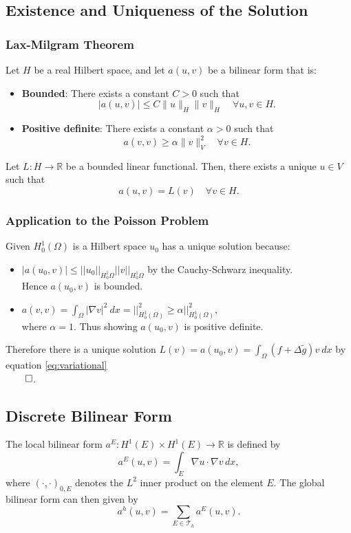 \documentclass[class=article, crop=false]{standalone}
\begin{document}
\subsection{Existence and Uniqueness of the Solution}

\subsubsection{Lax-Milgram Theorem}
\begin{theorem}
    Let $H$ be a real Hilbert space, and let $a(u,v)$  be a bilinear form that is:
    \begin{itemize}
        \item \textbf{Bounded}: There exists a constant $C > 0$ such that
        $$
        |a(u, v)| \leq C \|u\|_H \|v\|_H \quad \forall u, v \in H.
        $$
        \item \textbf{Positive definite}: There exists a constant $\alpha > 0$ such that
        $$
        a(v, v) \geq \alpha \|v\|_V^2 \quad \forall v \in H.
        $$
    \end{itemize}
    Let $L: H \rightarrow \mathbb{R}$ be a bounded linear functional. Then, there exists a unique $u \in V$ such that
    $$
    a(u, v) = L(v) \quad \forall v \in H.
    $$
\end{theorem}

\subsubsection{Application to the Poisson Problem}
Given $H^1_0(\Omega)$ is a Hilbert space $u_0$ has a unique solution because:
\begin{itemize}
    \item $|a(u_0,v)| \leq ||u_0||_{H^1_0{\Omega}} ||v||_{H^1_0{\Omega}} $ by the Cauchy-Schwarz inequality.\\
    Hence $a(u_0,v)$ is bounded.

    \item $a(v,v) = \int_{\Omega}|\nabla v|^2\ dx = ||^2_{H_0^1(\Omega)} \geq \alpha||^2_{H_0^1(\Omega)}$,\\
    where $\alpha = 1.$ Thus showing $a(u_0,v)$ is positive definite.
\end{itemize}

Therefore there is a unique solution $L(v) = a(u_0,v) = \int_\Omega (f + \Delta\tilde{g})v\ dx$ by equation \eqref{eq:variational}\\
$\qed$.

\subsection{Discrete Bilinear Form}
The local bilinear form $a^E: H^1(E) \times H^1(E) \rightarrow \mathbb{R}$ is defined by
$$
a^E(u, v) = \int_E \nabla u \cdot \nabla v \, dx,
$$
where $(\cdot, \cdot)_{0,E}$ denotes the $L^2$ inner product on the element $E$. The global bilinear form can then given by
$$
a^h(u, v) = \sum_{E \in \mathcal{T}_h} a^E(u, v).
$$
\end{document}
